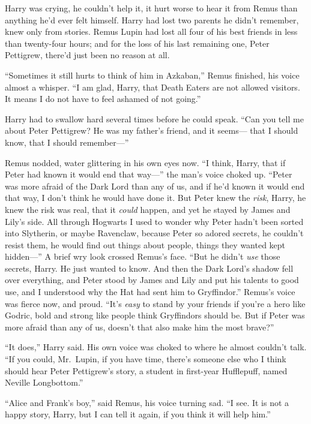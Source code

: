 Harry was crying, he couldn't help it, it hurt worse to hear it from
Remus than anything he'd ever felt himself. Harry had lost two parents
he didn't remember, knew only from stories. Remus Lupin had lost all
four of his best friends in less than twenty-four hours; and for the
loss of his last remaining one, Peter Pettigrew, there'd just been no
reason at all.

``Sometimes it still hurts to think of him in Azkaban,'' Remus finished,
his voice almost a whisper. ``I am glad, Harry, that Death Eaters are
not allowed visitors. It means I do not have to feel ashamed of not
going.''

Harry had to swallow hard several times before he could speak. ``Can you
tell me about Peter Pettigrew? He was my father's friend, and it
seems--- that I should know, that I should remember---''

Remus nodded, water glittering in his own eyes now. ``I think, Harry,
that if Peter had known it would end that way---'' the man's voice
choked up. ``Peter was more afraid of the Dark Lord than any of us, and
if he'd known it would end that way, I don't think he would have done
it. But Peter knew the \emph{risk}, Harry, he knew the risk was real,
that it \emph{could} happen, and yet he stayed by James and Lily's side.
All through Hogwarts I used to wonder why Peter hadn't been sorted into
Slytherin, or maybe Ravenclaw, because Peter so adored secrets, he
couldn't resist them, he would find out things about people, things they
wanted kept hidden---'' A brief wry look crossed Remus's face. ``But he
didn't \emph{use} those secrets, Harry. He just wanted to know. And then
the Dark Lord's shadow fell over everything, and Peter stood by James
and Lily and put his talents to good use, and I understood why the Hat
had sent him to Gryffindor.'' Remus's voice was fierce now, and proud.
``It's \emph{easy} to stand by your friends if you're a hero like
Godric, bold and strong like people think Gryffindors should be. But if
Peter was more afraid than any of us, doesn't that also make him the
most brave?''

``It does,'' Harry said. His own voice was choked to where he almost
couldn't talk. ``If you could, Mr.~Lupin, if you have time, there's
someone else who I think should hear Peter Pettigrew's story, a student
in first-year Hufflepuff, named Neville Longbottom.''

``Alice and Frank's boy,'' said Remus, his voice turning sad. ``I see.
It is not a happy story, Harry, but I can tell it again, if you think it
will help him.''

